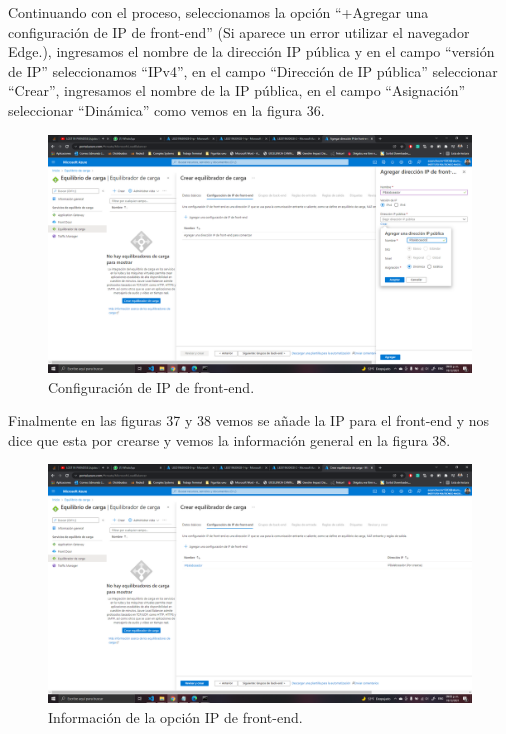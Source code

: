 \documentclass[11pt]{article}
\begin{document}
			Continuando con el proceso, seleccionamos la opción ``+Agregar una configuración de IP de front-end'' (Si aparece un error utilizar el navegador Edge.), ingresamos el nombre de la dirección IP pública y en el campo ``versión de IP'' seleccionamos ``IPv4'', en el campo ``Dirección de IP pública'' seleccionar ``Crear'', ingresamos el nombre de la IP pública, en el campo ``Asignación'' seleccionar ``Dinámica'' como vemos en la figura 36.
			\begin{figure}[H]
				\centering
				\includegraphics[scale=0.34]{resources/creacionBalanceador10-13.png}
				\caption{Configuración de IP de front-end.}\label{fig:picture}
			\end{figure}
			Finalmente en las figuras 37 y 38 vemos se añade la IP para el front-end y nos dice que esta por crearse y vemos la información general en la figura 38.
			\begin{figure}[H]
				\centering
				\includegraphics[scale=0.34]{resources/creacionBalanceador14-17.png}
				\caption{Información de la opción IP de front-end.}\label{fig:picture}
			\end{figure}
\end{document}
